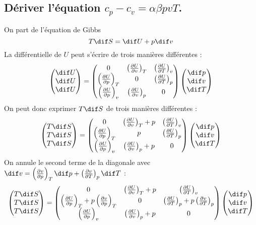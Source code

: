\subsection{Dériver l'équation $c_p-c_v = \alpha\beta pvT$.\label{q:1_7}}
On part de l'équation de Gibbs
\[ T \dif S = \dif U + p \dif v \]
La différentielle de $U$ peut s'écrire de trois manières différentes :
\[
	\begin{pmatrix} \dif U \\ \dif U \\ \dif U \end{pmatrix} = 
	\begin{pmatrix}
		0 & \thermodiff{U}{v}{T} & \thermodiff{U}{T}{v} \\
		\thermodiff{U}{p}{T} & 0 & \thermodiff{U}{T}{p} \\
		\thermodiff{U}{p}{v} & \thermodiff{U}{v}{p} & 0
	\end{pmatrix}
	\begin{pmatrix} \dif p \\ \dif v \\ \dif T \end{pmatrix}
\]
On peut donc exprimer $T\dif S$ de trois manières différentes :
\[ 
	\begin{pmatrix} T \dif S \\ T \dif S \\ T \dif S \end{pmatrix} = 
	\begin{pmatrix}
		0 & \thermodiff{U}{v}{T} + p & \thermodiff{U}{T}{v} \\
		\thermodiff{U}{p}{T} & p & \thermodiff{U}{T}{p} \\
		\thermodiff{U}{p}{v} & \thermodiff{U}{v}{p} + p & 0
	\end{pmatrix}
	\begin{pmatrix} \dif p \\ \dif v \\ \dif T \end{pmatrix}
\]
On annule le second terme de la diagonale avec $ \dif v = \thermodiff{v}{p}{T} \dif p + \thermodiff{v}{T}{p} \dif T $ :
\[ 
	\begin{pmatrix} T \dif S \\ T \dif S \\ T \dif S \end{pmatrix} = 
	\begin{pmatrix}
		0 & \thermodiff{U}{v}{T} + p & \thermodiff{U}{T}{v} \\
		\thermodiff{U}{p}{T} + p \thermodiff{v}{p}{T} & 0 & \thermodiff{U}{T}{p} + p \thermodiff{v}{T}{p} \\
		\thermodiff{U}{p}{v} & \thermodiff{U}{v}{p} + p & 0
	\end{pmatrix}
	\begin{pmatrix} \dif p \\ \dif v \\ \dif T \end{pmatrix}
\]

